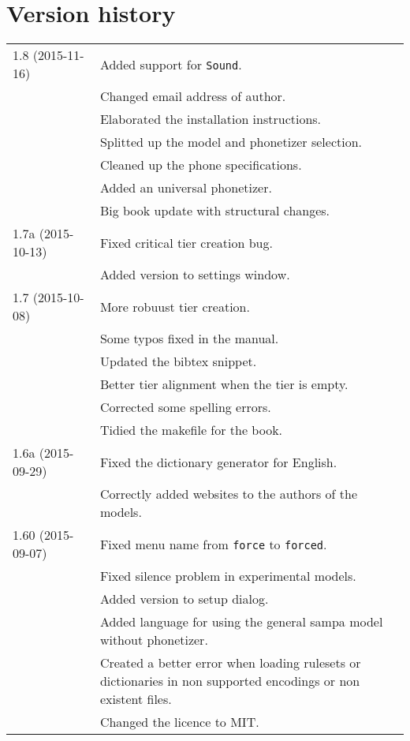 \section{Version history}
\begin{longtable}{|p{0.22\linewidth}p{0.8\linewidth}|}
	\hline
	1.8 (2015-11-16) & \tabitem Added support for \texttt{Sound}.\\
		& \tabitem Changed email address of author.\\
		& \tabitem Elaborated the installation instructions.\\
		& \tabitem Splitted up the model and phonetizer selection.\\
		& \tabitem Cleaned up the phone specifications.\\
		& \tabitem Added an universal phonetizer.\\
		& \tabitem Big book update with structural changes.\\
	\hline
	1.7a (2015-10-13) & \tabitem Fixed critical tier creation bug.\\
	& \tabitem Added version to settings window.\\
	\hline
	1.7 (2015-10-08) & \tabitem More robuust tier creation.\\
		& \tabitem Some typos fixed in the manual.\\
		& \tabitem Updated the bibtex snippet.\\
		&	\tabitem Better tier alignment when the tier is empty.\\
		&	\tabitem Corrected some spelling errors.\\
		&	\tabitem Tidied the makefile for the book.\\
	\hline
	1.6a (2015-09-29) & \tabitem Fixed the dictionary generator for English.\\
		& \tabitem Correctly added websites to the authors of the models.\\
	\hline
	1.60 (2015-09-07) & \tabitem Fixed menu name from \texttt{force} to
\texttt{forced}.\\
		& \tabitem Fixed silence problem in experimental models.\\
		& \tabitem Added version to setup dialog.\\
		& \tabitem Added language for using the general sampa model without
			phonetizer.\\
		& \tabitem Created a better error when loading rulesets or dictionaries in
			non supported encodings or non existent files.\\
		& \tabitem Changed the licence to MIT.\\

\end{longtable}
